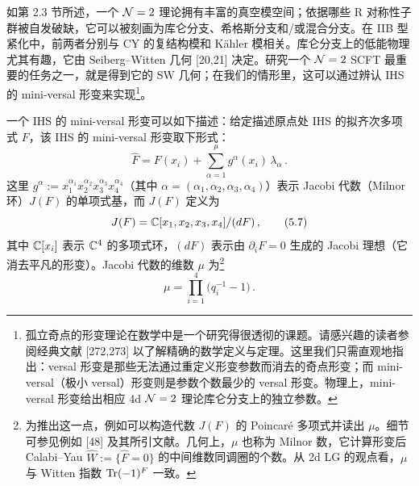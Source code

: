 
如第 2.3 节所述，一个 $\mathcal{N}=2$ 理论拥有丰富的真空模空间；依据哪些 R 对称性子群被自发破缺，它可以被刻画为库仑分支、希格斯分支和/或混合分支。在 IIB 型紧化中，前两者分别与 CY 的复结构模和 Kähler 模相关。库仑分支上的低能物理尤其有趣，它由 Seiberg--Witten 几何 [20,21] 决定。研究一个 $\mathcal{N}=2$ SCFT 最重要的任务之一，就是得到它的 SW 几何；在我们的情形里，这可以通过辨认 IHS 的 mini-versal 形变来实现\footnote{孤立奇点的形变理论在数学中是一个研究得很透彻的课题。请感兴趣的读者参阅经典文献 [272,273] 以了解精确的数学定义与定理。这里我们只需直观地指出：versal 形变是那些无法通过重定义形变参数而消去的奇点形变；而 mini-versal（极小 versal）形变则是参数个数最少的 versal 形变。物理上，mini-versal 形变给出相应 4d $\mathcal{N}=2$ 理论库仑分支上的独立参数。}。

一个 IHS 的 mini-versal 形变可以如下描述：给定描述原点处 IHS 的拟齐次多项式 $F$，该 IHS 的 mini-versal 形变取下形式：
\begin{equation}
  \hat F = F(x_i) + \sum_{\alpha=1}^{\mu} g^{\alpha}(x_i)\,\lambda_{\alpha}\,.
  \tag{5.6}
\end{equation}
这里 $g^{\alpha}:=x_1^{\alpha_1}x_2^{\alpha_2}x_3^{\alpha_3}x_4^{\alpha_4}$（其中 $\alpha=(\alpha_1,\alpha_2,\alpha_3,\alpha_4)$）表示 Jacobi 代数（Milnor 环）$J(F)$ 的单项式基，而 $J(F)$ 定义为
\begin{equation}
  J(F) = \mathbb{C}[x_1,x_2,x_3,x_4]/(dF)\,,
  \tag{5.7}
\end{equation}
其中 $\mathbb{C}[x_i]$ 表示 $\mathbb{C}^4$ 的多项式环，$(dF)$ 表示由 $\partial_iF=0$ 生成的 Jacobi 理想（它消去平凡的形变）。Jacobi 代数的维数 $\mu$ 为\footnote{为推出这一点，例如可以构造代数 $J(F)$ 的 Poincaré 多项式并读出 $\mu$。细节可参见例如 [48] 及其所引文献。几何上，$\mu$ 也称为 Milnor 数，它计算形变后 Calabi--Yau $\hat W:=\{\hat F=0\}$ 的中间维数同调圈的个数。从 2d LG 的观点看，$\mu$ 与 Witten 指数 $\operatorname{Tr}(-1)^F$ 一致。}
\begin{equation}
  \mu = \prod_{i=1}^{4}\bigl(q_i^{-1}-1\bigr)\,.
  \tag{5.8}
\end{equation}


